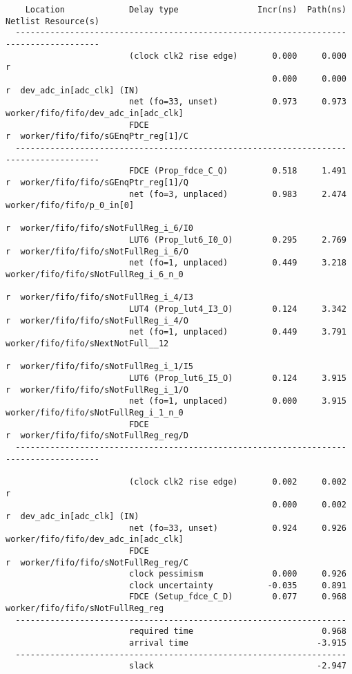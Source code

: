 \documentclass{article}
\begin{document}
\begin{lstlisting}
    Location             Delay type                Incr(ns)  Path(ns)    Netlist Resource(s)
  -------------------------------------------------------------------    -------------------
                         (clock clk2 rise edge)       0.000     0.000 r
                                                      0.000     0.000 r  dev_adc_in[adc_clk] (IN)
                         net (fo=33, unset)           0.973     0.973    worker/fifo/fifo/dev_adc_in[adc_clk]
                         FDCE                                         r  worker/fifo/fifo/sGEnqPtr_reg[1]/C
  -------------------------------------------------------------------    -------------------
                         FDCE (Prop_fdce_C_Q)         0.518     1.491 r  worker/fifo/fifo/sGEnqPtr_reg[1]/Q
                         net (fo=3, unplaced)         0.983     2.474    worker/fifo/fifo/p_0_in[0]
                                                                      r  worker/fifo/fifo/sNotFullReg_i_6/I0
                         LUT6 (Prop_lut6_I0_O)        0.295     2.769 r  worker/fifo/fifo/sNotFullReg_i_6/O
                         net (fo=1, unplaced)         0.449     3.218    worker/fifo/fifo/sNotFullReg_i_6_n_0
                                                                      r  worker/fifo/fifo/sNotFullReg_i_4/I3
                         LUT4 (Prop_lut4_I3_O)        0.124     3.342 r  worker/fifo/fifo/sNotFullReg_i_4/O
                         net (fo=1, unplaced)         0.449     3.791    worker/fifo/fifo/sNextNotFull__12
                                                                      r  worker/fifo/fifo/sNotFullReg_i_1/I5
                         LUT6 (Prop_lut6_I5_O)        0.124     3.915 r  worker/fifo/fifo/sNotFullReg_i_1/O
                         net (fo=1, unplaced)         0.000     3.915    worker/fifo/fifo/sNotFullReg_i_1_n_0
                         FDCE                                         r  worker/fifo/fifo/sNotFullReg_reg/D
  -------------------------------------------------------------------    -------------------

                         (clock clk2 rise edge)       0.002     0.002 r
                                                      0.000     0.002 r  dev_adc_in[adc_clk] (IN)
                         net (fo=33, unset)           0.924     0.926    worker/fifo/fifo/dev_adc_in[adc_clk]
                         FDCE                                         r  worker/fifo/fifo/sNotFullReg_reg/C
                         clock pessimism              0.000     0.926
                         clock uncertainty           -0.035     0.891
                         FDCE (Setup_fdce_C_D)        0.077     0.968    worker/fifo/fifo/sNotFullReg_reg
  -------------------------------------------------------------------
                         required time                          0.968
                         arrival time                          -3.915
  -------------------------------------------------------------------
                         slack                                 -2.947


\end{lstlisting}
\end{document}
